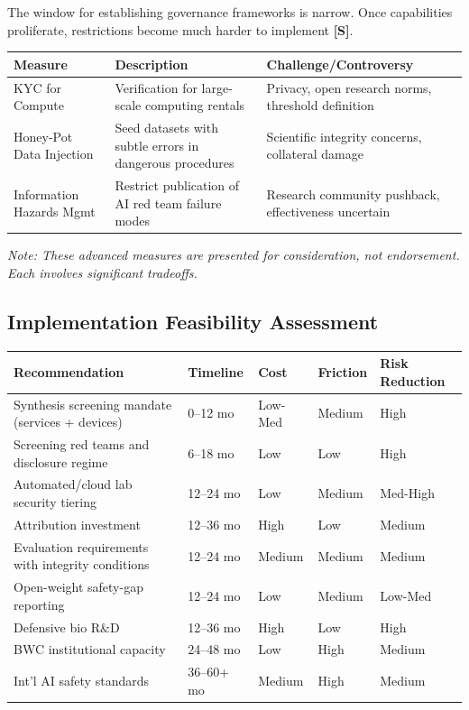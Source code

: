 \documentclass[11pt,letterpaper]{article}
\begin{document}
\begin{keybox}
The window for establishing governance frameworks is narrow. Once capabilities proliferate, restrictions become much harder to implement \textbf{[S]}.
\end{keybox}

\begin{notebox}
\begin{center}
\small
\begin{tabular}{L{3cm}L{4cm}L{5cm}}
\toprule
\textbf{Measure} & \textbf{Description} & \textbf{Challenge/Controversy} \\
\midrule
KYC for Compute & Verification for large-scale computing rentals & Privacy, open research norms, threshold definition \\
Honey-Pot Data Injection & Seed datasets with subtle errors in dangerous procedures & Scientific integrity concerns, collateral damage \\
Information Hazards Mgmt & Restrict publication of AI red team failure modes & Research community pushback, effectiveness uncertain \\
\bottomrule
\end{tabular}
\end{center}
\textit{Note: These advanced measures are presented for consideration, not endorsement. Each involves significant tradeoffs.}
\end{notebox}

\subsection{Implementation Feasibility Assessment}

\begin{center}
\small
\begin{tabular}{L{5.2cm}L{2.2cm}L{1.8cm}L{2cm}L{2.6cm}}
\toprule
\textbf{Recommendation} & \textbf{Timeline} & \textbf{Cost} & \textbf{Friction} & \textbf{Risk Reduction} \\
\midrule
Synthesis screening mandate (services + devices) & 0--12 mo & Low-Med & Medium & High \\
Screening red teams and disclosure regime & 6--18 mo & Low & Low & High \\
Automated/cloud lab security tiering & 12--24 mo & Low & Medium & Med-High \\
Attribution investment & 12--36 mo & High & Low & Medium \\
Evaluation requirements with integrity conditions & 12--24 mo & Medium & Medium & Medium \\
Open-weight safety-gap reporting & 12--24 mo & Low & Medium & Low-Med \\
Defensive bio R\&D & 12--36 mo & High & Low & High \\
BWC institutional capacity & 24--48 mo & Low & High & Medium \\
Int'l AI safety standards & 36--60+ mo & Medium & High & Medium \\
\bottomrule
\end{tabular}
\end{center}
\end{document}
